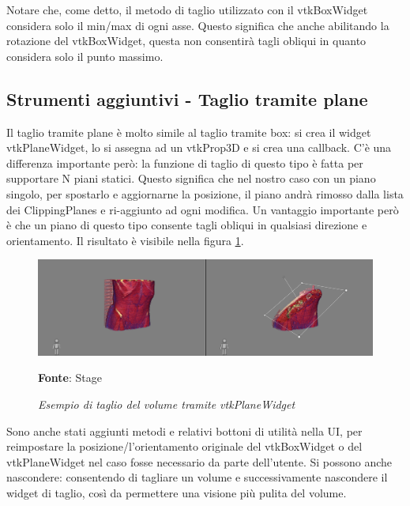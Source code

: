 Notare che, come detto, il metodo di taglio utilizzato con il vtkBoxWidget considera solo il min/max di ogni asse. Questo significa che anche abilitando la rotazione del vtkBoxWidget, questa non consentirà tagli obliqui in quanto considera solo il punto massimo. 

\subsection{Strumenti aggiuntivi - Taglio tramite plane}
Il taglio tramite plane è molto simile al taglio tramite box: si crea il widget vtkPlaneWidget, lo si assegna ad un vtkProp3D e si crea una callback. C'è una differenza importante però: la funzione di taglio di questo tipo è fatta per supportare N piani statici. Questo significa che nel nostro caso con un piano singolo, per spostarlo e aggiornarne la posizione, il piano andrà rimosso dalla lista dei ClippingPlanes e ri-aggiunto ad ogni modifica. Un vantaggio importante però è che un piano di questo tipo consente tagli obliqui in qualsiasi direzione e orientamento. Il risultato è visibile nella figura \ref{fig: Taglio Plane}.

\begin{figure}[h]
    \centering
    \includegraphics[width=1\textwidth]{immagini/svolgimento/planecrop.png}
    \caption{\textit{Esempio di taglio del volume tramite vtkPlaneWidget}}
    \textbf{Fonte}: Stage
    \label{fig: Taglio Plane}
\end{figure}

Sono anche stati aggiunti metodi e relativi bottoni di utilità nella UI, per reimpostare la posizione/l'orientamento originale del vtkBoxWidget o del vtkPlaneWidget nel caso fosse necessario da parte dell'utente. Si possono anche nascondere: consentendo di tagliare un volume e successivamente nascondere il widget di taglio, così da permettere una visione più pulita del volume.


